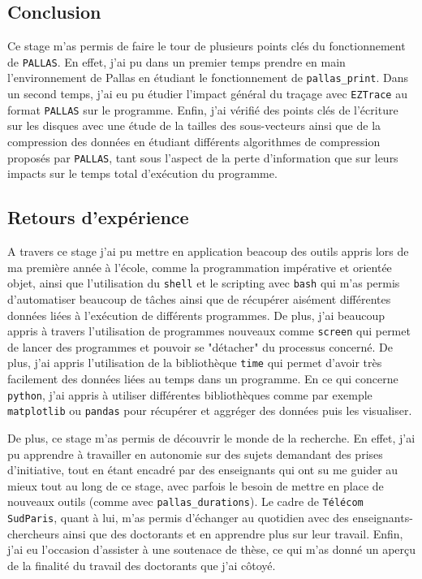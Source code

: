
\subsection{Conclusion}\label{ssec:conclusion_conclusion}

Ce stage m'as permis de faire le tour de plusieurs points clés du fonctionnement de \verb!PALLAS!.
En effet, j’ai pu dans un premier temps prendre en main l'environnement de Pallas en étudiant le fonctionnement de \verb!pallas_print!.
Dans un second temps, j'ai eu pu étudier l'impact général du traçage avec \verb!EZTrace! au format \verb!PALLAS! sur le programme.
Enfin, j'ai vérifié des points clés de l'écriture sur les disques avec une étude de la tailles des sous-vecteurs ainsi que de la compression des données en étudiant différents algorithmes 
de compression proposés par \verb!PALLAS!, tant sous l'aspect de la perte d'information que sur leurs impacts sur le temps total d'exécution du programme.


\subsection{Retours d'expérience}\label{ssec:conclusion_retours}


A travers ce stage j'ai pu mettre en application beacoup des outils appris lors de ma première année à l'école, comme la programmation impérative et orientée objet, ainsi que 
l'utilisation du \verb!shell! et le scripting avec \verb!bash! qui m'as permis d'automatiser beaucoup de tâches ainsi que de récupérer aisément différentes données liées 
à l'exécution de différents programmes.
De plus, j'ai beaucoup appris à travers l'utilisation de programmes nouveaux comme \verb!screen! qui permet de lancer des programmes et pouvoir se "détacher"
du processus concerné. De plus, j'ai appris l'utilisation de la bibliothèque \verb!time! qui permet d'avoir très facilement des données liées au temps dans un programme. En ce qui concerne \verb!python!,
j'ai appris à utiliser différentes bibliothèques comme par exemple \verb!matplotlib! ou \verb!pandas! pour récupérer et aggréger des données puis les visualiser.

De plus, ce stage m'as permis de découvrir le monde de la recherche. En effet, j'ai pu apprendre à travailler en autonomie sur des sujets demandant des prises d'initiative, tout en étant 
encadré par des enseignants qui ont su me guider au mieux tout au long de ce stage, avec 
parfois le besoin de mettre en place de nouveaux outils (comme avec \verb!pallas_durations!). Le cadre de \verb!Télécom SudParis!, quant à lui, m'as permis d'échanger au quotidien 
avec des enseignants-chercheurs ainsi que des doctorants et en apprendre plus sur leur travail. Enfin, j'ai eu l'occasion d'assister à une soutenace de thèse, ce qui m'as 
donné un aperçu de la finalité du travail des doctorants que j'ai côtoyé.

